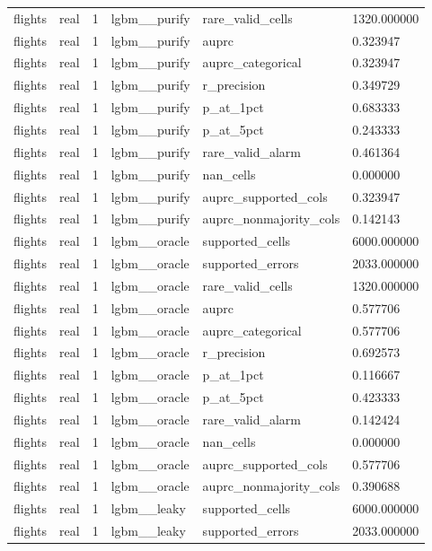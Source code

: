 \begin{tabular}{llllll}
flights & real & 1 & lgbm\_\_purify & rare\_valid\_cells & 1320.000000 \\
flights & real & 1 & lgbm\_\_purify & auprc & 0.323947 \\
flights & real & 1 & lgbm\_\_purify & auprc\_categorical & 0.323947 \\
flights & real & 1 & lgbm\_\_purify & r\_precision & 0.349729 \\
flights & real & 1 & lgbm\_\_purify & p\_at\_1pct & 0.683333 \\
flights & real & 1 & lgbm\_\_purify & p\_at\_5pct & 0.243333 \\
flights & real & 1 & lgbm\_\_purify & rare\_valid\_alarm & 0.461364 \\
flights & real & 1 & lgbm\_\_purify & nan\_cells & 0.000000 \\
flights & real & 1 & lgbm\_\_purify & auprc\_supported\_cols & 0.323947 \\
flights & real & 1 & lgbm\_\_purify & auprc\_nonmajority\_cols & 0.142143 \\
flights & real & 1 & lgbm\_\_oracle & supported\_cells & 6000.000000 \\
flights & real & 1 & lgbm\_\_oracle & supported\_errors & 2033.000000 \\
flights & real & 1 & lgbm\_\_oracle & rare\_valid\_cells & 1320.000000 \\
flights & real & 1 & lgbm\_\_oracle & auprc & 0.577706 \\
flights & real & 1 & lgbm\_\_oracle & auprc\_categorical & 0.577706 \\
flights & real & 1 & lgbm\_\_oracle & r\_precision & 0.692573 \\
flights & real & 1 & lgbm\_\_oracle & p\_at\_1pct & 0.116667 \\
flights & real & 1 & lgbm\_\_oracle & p\_at\_5pct & 0.423333 \\
flights & real & 1 & lgbm\_\_oracle & rare\_valid\_alarm & 0.142424 \\
flights & real & 1 & lgbm\_\_oracle & nan\_cells & 0.000000 \\
flights & real & 1 & lgbm\_\_oracle & auprc\_supported\_cols & 0.577706 \\
flights & real & 1 & lgbm\_\_oracle & auprc\_nonmajority\_cols & 0.390688 \\
flights & real & 1 & lgbm\_\_leaky & supported\_cells & 6000.000000 \\
flights & real & 1 & lgbm\_\_leaky & supported\_errors & 2033.000000 \\

\end{tabular}
